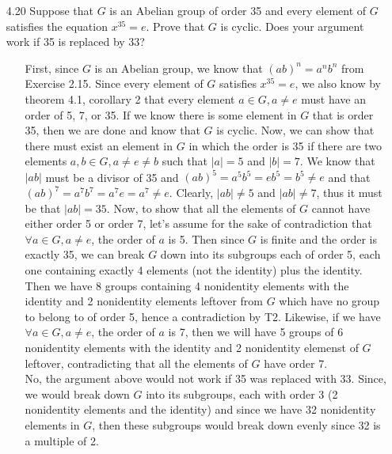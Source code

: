 \documentclass[12pt]{article}
\begin{document}
\begin{enumerate}
\item[4.20] Suppose that $G$ is an Abelian group of order 35 and every element of $G$ satisfies
the equation $x^{35} = e$. Prove that $G$ is cyclic. Does your argument work if 35 is replaced
by 33?
\begin{enumerate}
\item[] First, since $G$ is an Abelian group, we know that $(ab)^n = a^nb^n$ from
Exercise 2.15. Since every element of $G$ satisfies $x^{35} = e$, we also know
by theorem 4.1, corollary 2 that every element $a \in G, a \neq e$ must have an
order of 5, 7, or 35. If we know there is some element in $G$ that is order 35, then we
are done and know that $G$ is cyclic. Now, we can show that there must exist an element in $G$ in which
the order is 35 if there are two elements $a, b \in G, a \neq e \neq b$ such that $|a| = 5$ and $|b| = 7$.
We know that $|ab|$ must be a divisor of 35 and $(ab)^5 = a^5b^5 = eb^5 = b^5 \neq e$ 
and that $(ab)^7 = a^7b^7 = a^7e = a^7 \neq e$. Clearly, $|ab| \neq 5$ and $|ab| \neq 7$, thus
it must be that $|ab| = 35$. Now, to show that all the 
elements of $G$ cannot have either order 5 or order 7, let's assume for the sake of contradiction that 
$\forall a \in G, a \neq e$, the order of $a$ is 5. Then since $G$ is finite and the order is 
exactly 35, we can break $G$ down into its subgroups each of order 5, each one containing
exactly 4 elements (not the identity) plus the identity. Then we have 8 groups containing 4 
nonidentity elements with the identity and 2 nonidentity elements leftover from $G$ which 
have no group to belong to of order 5, hence a contradiction by T2. Likewise, if we have 
$\forall a \in G, a \neq e$, the order of $a$ is 7, then we will have 5 groups of 
6 nonidentity elements with the identity and 2 nonidentity elemenst of $G$ leftover,
contradicting that all the elements of $G$ have order 7. \\
No, the argument above would not work if 35 was replaced with 33. Since, we would
break down $G$ into its subgroups, each with order 3 (2 nonidentity elements and
the identity) and since we have 32 nonidentity elements in $G$, then these subgroups 
would break down evenly since 32 is a multiple of 2.
\end{enumerate}


\end{enumerate}
\end{document}
